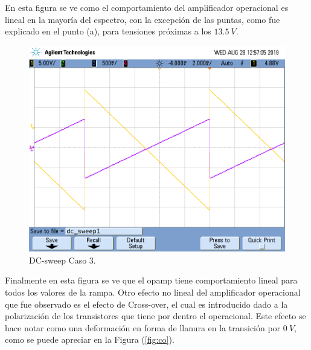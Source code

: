 En esta figura se ve como el comportamiento del amplificador operacional es lineal en la mayoría del espectro, con la excepción de las puntas, como fue explicado en el punto (a), para tensiones próximas a los $ 13.5 \ V$.
\begin{figure}[H]	
	\centering
	\includegraphics[width=\textwidth]{Ejercicio1/Imagenes/dc_sweep_c3.png}
	\caption{DC-sweep Caso 3.}
	\label{fig:dcc3}
\end{figure} 
Finalmente en esta figura se ve que el opamp tiene comportamiento lineal para todos los valores de la rampa. Otro efecto no lineal del amplificador operacional que fue observado es el efecto de Cross-over, el cual es introducido dado a la polarización de los transistores que tiene por dentro el operacional. Este efecto se hace notar como una deformación en forma de llanura en la transición por $0 \ V$, como se puede apreciar en la Figura (\ref{fig:co}).

